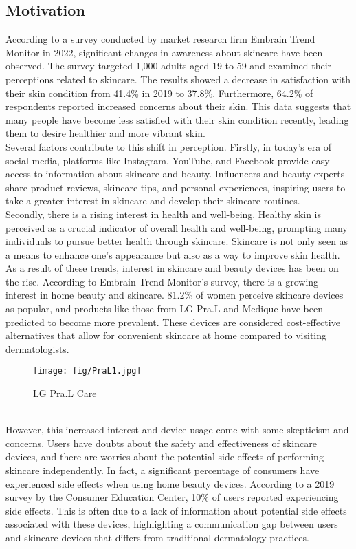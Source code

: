 \documentclass[conference]{IEEEtran}
\begin{document}
\subsection{Motivation} 
According to a survey conducted by market research firm Embrain Trend Monitor in 2022, significant changes in awareness about skincare have been observed. The survey targeted 1,000 adults aged 19 to 59 and examined their perceptions related to skincare. The results showed a decrease in satisfaction with their skin condition from 41.4\% in 2019 to 37.8\%. Furthermore, 64.2\% of respondents reported increased concerns about their skin. This data suggests that many people have become less satisfied with their skin condition recently, leading them to desire healthier and more vibrant skin.
\\Several factors contribute to this shift in perception. Firstly, in today's era of social media, platforms like Instagram, YouTube, and Facebook provide easy access to information about skincare and beauty. Influencers and beauty experts share product reviews, skincare tips, and personal experiences, inspiring users to take a greater interest in skincare and develop their skincare routines.
\\Secondly, there is a rising interest in health and well-being. Healthy skin is perceived as a crucial indicator of overall health and well-being, prompting many individuals to pursue better health through skincare. Skincare is not only seen as a means to enhance one's appearance but also as a way to improve skin health.
\\As a result of these trends, interest in skincare and beauty devices has been on the rise. According to Embrain Trend Monitor's survey, there is a growing interest in home beauty and skincare. 81.2\% of women perceive skincare devices as popular, and products like those from LG Pra.L and Medique have been predicted to become more prevalent. These devices are considered cost-effective alternatives that allow for convenient skincare at home compared to visiting dermatologists.
\begin{figure} [h]
    \texttt{[image: fig/PraL1.jpg]}
    \caption{LG Pra.L Care}
\end{figure}
\\However, this increased interest and device usage come with some skepticism and concerns. Users have doubts about the safety and effectiveness of skincare devices, and there are worries about the potential side effects of performing skincare independently. In fact, a significant percentage of consumers have experienced side effects when using home beauty devices. According to a 2019 survey by the Consumer Education Center, 10\% of users reported experiencing side effects. This is often due to a lack of information about potential side effects associated with these devices, highlighting a communication gap between users and skincare devices that differs from traditional dermatology practices.
\end{document}
